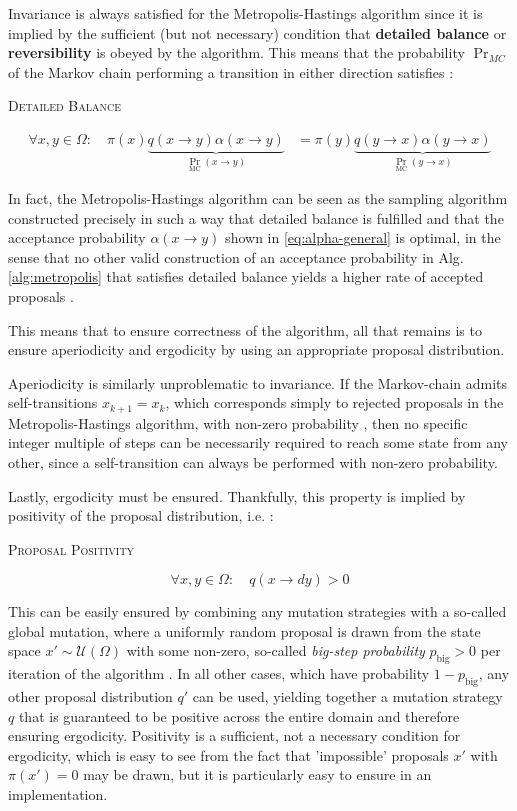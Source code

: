 \documentclass[oneside, a4paper]{article}
\newcommand{\equationnamed}[2]{%
  \setlength{\fboxsep}{2pt} %
  \setlength{\fboxrule}{0.01pt}
  \begin{center}
    \begin{minipage}{\textwidth}
      \begin{center}\textsc{#1}\end{center}
      #2
    \end{minipage}
  \end{center}
}
\newcommand\br[1]{\left(#1\right)}
\begin{document}
Invariance is always satisfied for the Metropolis-Hastings algorithm since it is implied by the sufficient (but not necessary) condition that \textbf{detailed balance}\autocite{survey} or \textbf{reversibility}\autocite{understanding-mh-chib-greenberg} is obeyed by the algorithm. This means that the probability $\Pr_{MC}$ of the Markov chain performing a transition in either direction satisfies \autocite{survey}:
\equationnamed{Detailed Balance}{\begin{align}\label{eq:detailed-balance}
  \forall x,y\in\Omega: \quad \pi(x) \underbrace{q(x\to y) \alpha (x\to y)}_{\Pr_{\text{MC}}(x\to y)} &= \pi(y) \underbrace{q(y\to x) \alpha (y\to x)}_{\Pr_{\text{MC}}(y\to x)}
\end{align}}
In fact, the Metropolis-Hastings algorithm can be seen as the sampling algorithm constructed precisely in such a way that detailed balance is fulfilled \autocite{understanding-mh-chib-greenberg} and that the acceptance probability $\alpha(x\to y)$ shown in \autoref{eq:alpha-general} is optimal, in the sense that no other valid construction of an acceptance probability in Alg. \ref{alg:metropolis} that satisfies detailed balance yields a higher rate of accepted proposals \autocite{mh-optimal}.


This means that to ensure correctness of the algorithm, all that remains is to ensure aperiodicity and ergodicity by using an appropriate proposal distribution. 

Aperiodicity is similarly unproblematic to invariance. If the Markov-chain admits self-transitions $x_{k+1} = x_k$, which corresponds simply to rejected proposals in the Metropolis-Hastings algorithm, with non-zero probability \autocite{convergence-mh}, then no specific integer multiple of steps can be necessarily required to reach some state from any other, since a self-transition can always be performed with non-zero probability. 

Lastly, ergodicity must be ensured. Thankfully, this property is implied by positivity of the proposal distribution, i.e. \autocite{convergence-mh}:
\equationnamed{Proposal Positivity}{\begin{equation}
  \forall x,y \in \Omega: \quad q(x \to dy) > 0
\end{equation}}

This can be easily ensured by combining any mutation strategies with a so-called global mutation, where a uniformly random proposal is drawn from the state space $x' \sim \mathcal{U}\br{\Omega}$ with some non-zero, so-called \textit{big-step probability} $p_{\text{big}}>0$ per iteration of the algorithm \autocite{survey}. In all other cases, which have probability $1-p_{\text{big}}$, any other proposal distribution $q'$ can be used, yielding together a mutation strategy $q$ that is guaranteed to be positive across the entire domain and therefore ensuring ergodicity. Positivity is a sufficient, not a necessary condition for ergodicity, which is easy to see from the fact that 'impossible' proposals $x'$ with $\pi(x')=0$ may be drawn, but it is particularly easy to ensure in an implementation.
\end{document}
